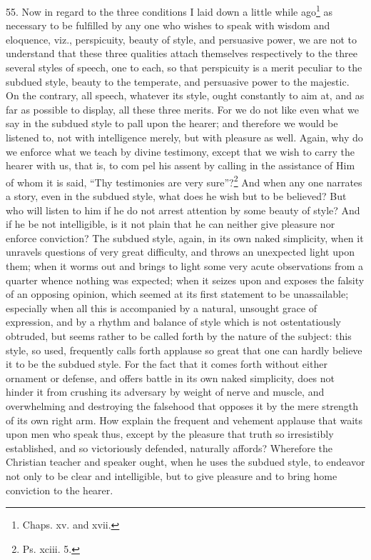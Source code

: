 55. Now in regard to the three conditions I laid down a little while ago\footnote{Chaps. xv. and xvii.} as necessary to be fulfilled by any one who wishes to speak with wisdom and eloquence, viz., perspicuity, beauty of style, and persuasive power, we are not to understand that these three qualities attach themselves respectively to the three several styles of speech, one to each, so that perspicuity is a merit peculiar to the subdued style, beauty to the temperate, and persuasive power to the majestic. On the contrary, all speech, whatever its style, ought constantly to aim at, and as far as possible to display, all these three merits. For we do not like even what we say in the subdued style to pall upon the hearer; and therefore we would be listened to, not with intelligence merely, but with pleasure as well. Again, why do we enforce what we teach by divine testimony, except that we wish to carry the hearer with us, that is, to com  pel his assent by calling in the assistance of Him of whom it is said, “Thy testimonies are very sure”?\footnote{Ps. xciii. 5.} And when any one narrates a story, even in the subdued style, what does he wish but to be believed? But who will listen to him if he do not arrest attention by some beauty of style? And if he be not intelligible, is it not plain that he can neither give pleasure nor enforce conviction? The subdued style, again, in its own naked simplicity, when it unravels questions of very great difficulty, and throws an unexpected light upon them; when it worms out and brings to light some very acute observations from a quarter whence nothing was expected; when it seizes upon and exposes the falsity of an opposing opinion, which seemed at its first statement to be unassailable; especially when all this is accompanied by a natural, unsought grace of expression, and by a rhythm and balance of style which is not ostentatiously obtruded, but seems rather to be called forth by the nature of the subject: this style, so used, frequently calls forth applause so great that one can hardly believe it to be the subdued style. For the fact that it comes forth without either ornament or defense, and offers battle in its own naked simplicity, does not hinder it from crushing its adversary by weight of nerve and muscle, and overwhelming and destroying the falsehood that opposes it by the mere strength of its own right arm. How explain the frequent and vehement applause that waits upon men who speak thus, except by the pleasure that truth so irresistibly established, and so victoriously defended, naturally affords? Wherefore the Christian teacher and speaker ought, when he uses the subdued style, to endeavor not only to be clear and intelligible, but to give pleasure and to bring home conviction to the hearer.

